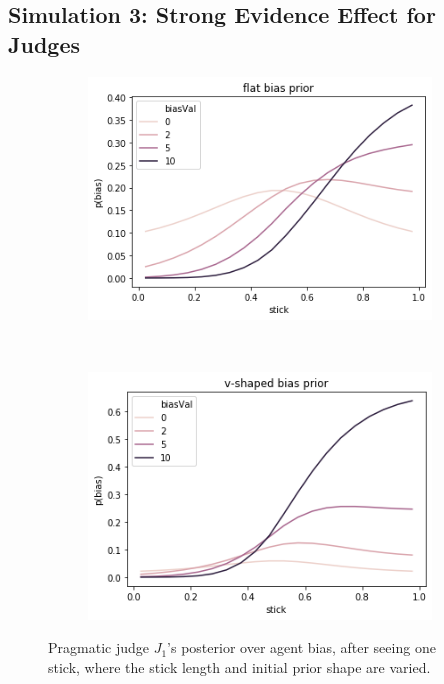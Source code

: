 \documentclass[10pt,letterpaper]{article}
\begin{document}
\subsection{Simulation 3: Strong Evidence Effect for Judges}
\begin{figure}[h]
\centering
\begin{subfigure}{0.45\textwidth}
	\centering
	\includegraphics[width=\textwidth]{figures/seeFlat.png}
\end{subfigure}
~
\begin{subfigure}{0.45\textwidth}
	\centering
	\includegraphics[width=\textwidth]{figures/seeV.png}
\end{subfigure}
\caption{Pragmatic judge $J_1$'s posterior over agent bias, after seeing one stick, where the stick length
and initial prior shape are varied.} 
\label{seeJudge}
\end{figure}
\end{document}
